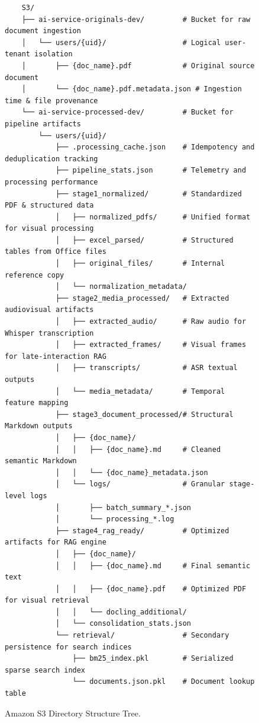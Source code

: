 \begin{figure}[H]
    \centering

    \begin{verbatim}
    S3/
    ├── ai-service-originals-dev/         # Bucket for raw document ingestion
    │   └── users/{uid}/                  # Logical user-tenant isolation
    │       ├── {doc_name}.pdf            # Original source document
    │       └── {doc_name}.pdf.metadata.json # Ingestion time & file provenance
    └── ai-service-processed-dev/         # Bucket for pipeline artifacts
        └── users/{uid}/
            ├── .processing_cache.json    # Idempotency and deduplication tracking
            ├── pipeline_stats.json       # Telemetry and processing performance
            ├── stage1_normalized/        # Standardized PDF & structured data
            │   ├── normalized_pdfs/      # Unified format for visual processing
            │   ├── excel_parsed/         # Structured tables from Office files
            │   ├── original_files/       # Internal reference copy
            │   └── normalization_metadata/
            ├── stage2_media_processed/   # Extracted audiovisual artifacts
            │   ├── extracted_audio/      # Raw audio for Whisper transcription
            │   ├── extracted_frames/     # Visual frames for late-interaction RAG
            │   ├── transcripts/          # ASR textual outputs
            │   └── media_metadata/       # Temporal feature mapping
            ├── stage3_document_processed/# Structural Markdown outputs
            │   ├── {doc_name}/
            │   │   ├── {doc_name}.md     # Cleaned semantic Markdown
            │   │   └── {doc_name}_metadata.json
            │   └── logs/                 # Granular stage-level logs
            │       ├── batch_summary_*.json
            │       └── processing_*.log
            ├── stage4_rag_ready/         # Optimized artifacts for RAG engine
            │   ├── {doc_name}/
            │   │   ├── {doc_name}.md     # Final semantic text
            │   │   ├── {doc_name}.pdf    # Optimized PDF for visual retrieval
            │   │   └── docling_additional/
            │   └── consolidation_stats.json
            └── retrieval/                # Secondary persistence for search indices
                ├── bm25_index.pkl        # Serialized sparse search index
                └── documents.json.pkl    # Document lookup table
    \end{verbatim}

    \caption{Amazon S3 Directory Structure Tree.}
    \label{fig:s3_tree}

\end{figure}

